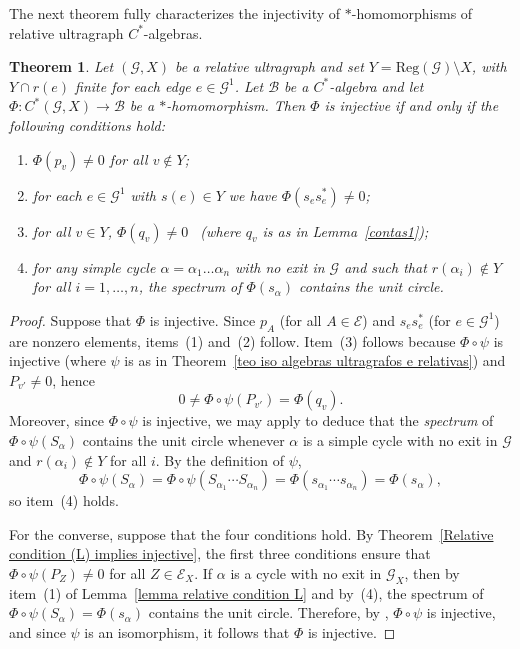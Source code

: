 \documentclass[12pt, reqno]{amsart}
\newtheorem{theorem}{Theorem}[section]
\theoremstyle{definition}
\theoremstyle{remark}
\numberwithin{equation}{section}
\begin{document}
The next theorem fully characterizes the injectivity of $*$-homomorphisms of relative ultragraph
$C^*$-algebras.

\begin{theorem}
Let $(\mathcal{G},X)$ be a relative ultragraph and set $Y=\mathrm{Reg}(\mathcal{G})\setminus X$,
with $Y\cap r(e)$ finite for each edge $e\in\mathcal{G}^1$. Let $\mathcal{B}$ be a $C^*$-algebra
and let $\Phi:C^*(\mathcal{G},X)\to \mathcal{B}$ be a $*$-homomorphism. Then $\Phi$ is injective
if and only if the following conditions hold:
\begin{enumerate}
    \item $\Phi(p_v)\neq 0$ for all $v\notin Y$;
    \item for each $e\in\mathcal{G}^1$ with $s(e)\in Y$ we have $\Phi(s_e s_e^*)\neq 0$;
    \item for all $v\in Y$, $\Phi(q_v)\neq 0$ \ (where $q_v$ is as in Lemma~\ref{contas1});
    \item for any simple cycle $\alpha=\alpha_1\ldots \alpha_n$ with no exit in $\mathcal{G}$ and
    such that $r(\alpha_i)\notin Y$ for all $i=1,\ldots,n$, the spectrum of $\Phi(s_\alpha)$
    contains the unit circle.
\end{enumerate}
\end{theorem}

 
\begin{proof}
Suppose that $\Phi$ is injective. Since $p_A$ (for all $A \in \mathcal{E}$) and $s_e s_e^*$ (for
$e \in \mathcal{G}^1$) are nonzero elements, items~(1) and~(2) follow. Item~(3) follows because
$\Phi \circ \psi$ is injective (where $\psi$ is as in
Theorem~\ref{teo iso algebras ultragrafos e relativas}) and $P_{v'} \neq 0$, hence
\[
0 \neq \Phi \circ \psi(P_{v'}) = \Phi(q_v).
\]
Moreover, since $\Phi \circ \psi$ is injective, we may apply \cite[Theorem~7.4]{DDH} to deduce
that the \emph{spectrum} of $\Phi \circ \psi(S_{\alpha})$ contains the unit circle whenever
$\alpha$ is a simple cycle with no exit in $\mathcal{G}$ and $r(\alpha_i) \notin Y$ for all $i$.
By the definition of $\psi$,
\[
\Phi \circ \psi(S_{\alpha})
= \Phi \circ \psi (S_{\alpha_1} \cdots S_{\alpha_n})
= \Phi(s_{\alpha_1} \cdots s_{\alpha_n})
= \Phi(s_{\alpha}),
\]
so item~(4) holds.

\smallskip
For the converse, suppose that the four conditions hold. By
Theorem~\ref{Relative condition (L) implies injective}, the first three conditions ensure that
$\Phi \circ \psi (P_Z) \neq 0$ for all $Z \in \mathcal{E}_X$. If $\alpha$ is a cycle with no
exit in $\mathcal{G}_X$, then by item~(1) of Lemma~\ref{lemma relative condition L} and by~(4),
the spectrum of $\Phi \circ \psi(S_{\alpha}) = \Phi(s_{\alpha})$ contains the unit circle.
Therefore, by \cite[Theorem~7.4]{DDH}, $\Phi \circ \psi$ is injective, and since $\psi$ is an
isomorphism, it follows that $\Phi$ is injective.
\end{proof}
\end{document}
